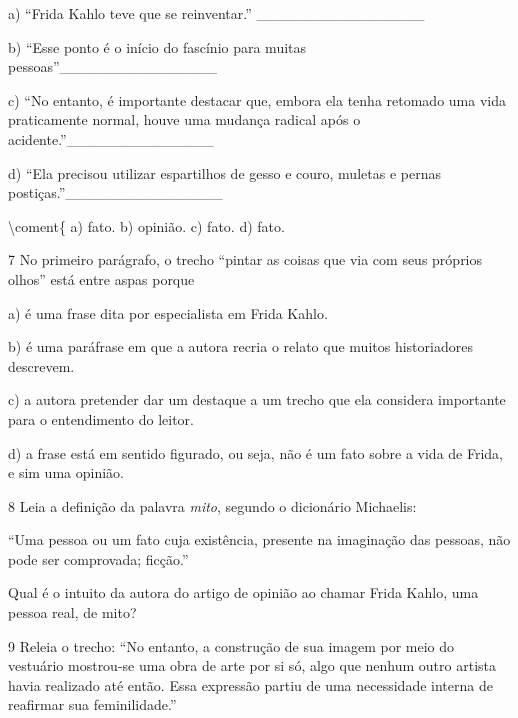 a) ``Frida Kahlo teve que se reinventar.''
\_\_\_\_\_\_\_\_\_\_\_\_\_\_\_\_

b) ``Esse ponto é o início do fascínio para muitas
pessoas''\_\_\_\_\_\_\_\_\_\_\_\_\_\_\_

c) ``No entanto, é importante destacar que, embora ela tenha retomado
uma vida praticamente normal, houve uma mudança radical após o
acidente.''\_\_\_\_\_\_\_\_\_\_\_\_\_\_

d) ``Ela precisou utilizar espartilhos de gesso e couro, muletas e
pernas postiças.''\_\_\_\_\_\_\_\_\_\_\_\_\_\_\_

\textbackslash coment\{ a) fato. b) opinião. c) fato. d) fato.

\num{7} No primeiro parágrafo, o trecho ``pintar as coisas que via com
seus próprios olhos'' está entre aspas porque

a) é uma frase dita por especialista em Frida Kahlo.

b) é uma paráfrase em que a autora recria o relato que muitos
historiadores descrevem.

c) a autora pretender dar um destaque a um trecho que ela considera
importante para o entendimento do leitor.

d) a frase está em sentido figurado, ou seja, não é um fato sobre a vida
de Frida, e sim uma opinião.


\num{8} Leia a definição da palavra \emph{mito}, segundo o dicionário
Michaelis:

``Uma pessoa ou um fato cuja existência, presente na imaginação das
pessoas, não pode ser comprovada; ficção.''

Qual é o intuito da autora do artigo de opinião ao chamar Frida Kahlo,
uma pessoa real, de mito?



\num{9} Releia o trecho: ``No entanto, a construção de sua imagem por
meio do vestuário mostrou-se uma obra de arte por si só, algo que nenhum
outro artista havia realizado até então. Essa expressão partiu de uma
necessidade interna de reafirmar sua feminilidade.''

